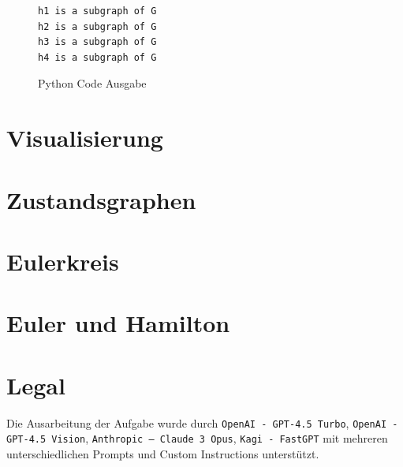 \documentclass[a4paper,11pt]{report}
\begin{document}
\begin{figure}
    \centering
    \begin{verbatim}
h1 is a subgraph of G
h2 is a subgraph of G
h3 is a subgraph of G
h4 is a subgraph of G
    \end{verbatim}
    \caption{Python Code Ausgabe}
    \label{fig:is_subgraph}
\end{figure}



\newpage

\chapter{Visualisierung}



\newpage

\chapter{Zustandsgraphen}



\newpage

\chapter{Eulerkreis}



\newpage

\chapter{Euler und Hamilton}



\newpage

\chapter{Legal}
Die Ausarbeitung der Aufgabe wurde durch \texttt{OpenAI - GPT-4.5 Turbo}, \texttt{OpenAI - GPT-4.5 Vision}, \texttt{Anthropic -- Claude 3 Opus},  \texttt{Kagi - FastGPT} mit mehreren unterschiedlichen Prompts und Custom Instructions unterstützt.
\end{document}
